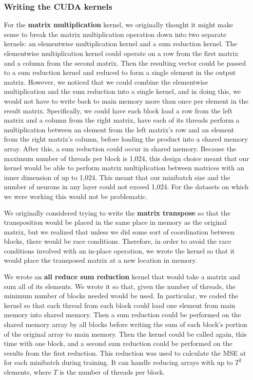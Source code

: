 \documentclass[11pt,a4paper]{article}
\begin{document}
\subsubsection{Writing the CUDA kernels} \label{cuda_kernels}
For the \textbf{matrix multiplication} kernel, we originally thought it might make sense to break the matrix multiplication operation down into two separate kernels: an elementwise multiplication kernel and a sum reduction kernel. The elementwise multiplication kernel could operate on a row from the first matrix and a column from the second matrix. Then the resulting vector could be passed to a sum reduction kernel and reduced to form a single element in the output matrix. However, we noticed that we could combine the elementwise multiplication and the sum reduction into a single kernel, and in doing this, we would not have to write back to main memory more than once per element in the result matrix. Specifically, we could have each block load a row from the left matrix and a column from the right matrix, have each of its threads perform a multiplication between an element from the left matrix's row and an element from the right matrix's column, before loading the product into a shared memory array. After this, a sum reduction could occur in shared memory. Because the maximum number of threads per block is 1,024, this design choice meant that our kernel would be able to perform matrix multiplication between matrices with an inner dimension of up to 1,024. This meant that our minibatch size and the number of neurons in any layer could not exceed 1,024. For the datasets on which we were working this would not be problematic.

We originally considered trying to write the \textbf{matrix transpose} so that the transposition would be placed in the same place in memory as the original matrix, but we realized that unless we did some sort of coordination between blocks, there would be race conditions. Therefore, in order to avoid the race conditions involved with an in-place operation, we wrote the kernel so that it would place the transposed matrix at a new location in memory. 

We wrote an \textbf{all reduce sum reduction} kernel that would take a matrix and sum all of its elements. We wrote it so that, given the number of threads, the minimum number of blocks needed would be used. In particular, we coded the kernel so that each thread from each block could load one element from main memory into shared memory. Then a sum reduction could be performed on the shared memory array by all blocks before writing the sum of each block's portion of the original array to main memory. Then the kernel could be called again, this time with one block, and a second sum reduction could be performed on the results from the first reduction. This reduction was used to calculate the MSE at for each minibatch during training. It can handle reducing arrays with up to $T^2$ elements, where $T$ is the number of threads per block.
\end{document}

